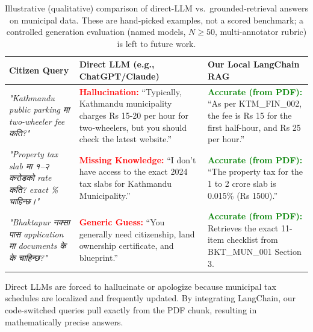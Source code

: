 \begin{table}[H]
  \centering
  \footnotesize
  \caption{Illustrative (qualitative) comparison of direct-LLM vs.\ grounded-retrieval answers on municipal data. These are hand-picked examples, not a scored benchmark; a controlled generation evaluation (named models, $N\geq50$, multi-annotator rubric) is left to future work.}
  \label{tab:llm-vs-rag}
  \begin{tabular}{@{}p{3.5cm} p{5.5cm} p{5.5cm}@{}}
    \toprule
    \textbf{Citizen Query} & \textbf{Direct LLM (e.g., ChatGPT/Claude)} & \textbf{Our Local LangChain RAG} \\
    \midrule
    \textit{"Kathmandu public parking मा two-wheeler fee कति?"} & 
    \textcolor{red}{\textbf{Hallucination:}} ``Typically, Kathmandu municipality charges Rs 15-20 per hour for two-wheelers, but you should check the latest website.'' & 
    \textcolor{green}{\textbf{Accurate (from PDF):}} ``As per KTM\_FIN\_002, the fee is Rs 15 for the first half-hour, and Rs 25 per hour.'' \\
    \addlinespace
    \textit{"Property tax slab मा १–२ करोडको rate कति? exact \% चाहिन्छ।"} & 
    \textcolor{red}{\textbf{Missing Knowledge:}} ``I don't have access to the exact 2024 tax slabs for Kathmandu Municipality.'' & 
    \textcolor{green}{\textbf{Accurate (from PDF):}} ``The property tax for the 1 to 2 crore slab is 0.015\% (Rs 1500).'' \\
    \addlinespace
    \textit{"Bhaktapur नक्सा पास application मा documents के के चाहिन्छ?"} & 
    \textcolor{red}{\textbf{Generic Guess:}} ``You generally need citizenship, land ownership certificate, and blueprint.'' & 
    \textcolor{green}{\textbf{Accurate (from PDF):}} Retrieves the exact 11-item checklist from BKT\_MUN\_001 Section 3. \\
    \bottomrule
  \end{tabular}
\end{table}

Direct LLMs are forced to hallucinate or apologize because municipal tax schedules are localized and frequently updated. By integrating LangChain, our code-switched queries pull exactly from the PDF chunk, resulting in mathematically precise answers.

